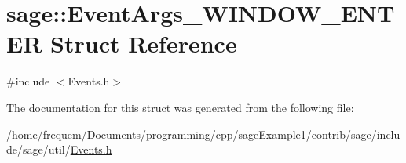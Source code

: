\hypertarget{structsage_1_1EventArgs__WINDOW__ENTER}{}\section{sage\+::Event\+Args\+\_\+\+W\+I\+N\+D\+O\+W\+\_\+\+E\+N\+T\+ER Struct Reference}
\label{structsage_1_1EventArgs__WINDOW__ENTER}


{\ttfamily \#include $<$Events.\+h$>$}



The documentation for this struct was generated from the following file\+:\begin{DoxyCompactItemize}
\item 
/home/frequem/\+Documents/programming/cpp/sage\+Example1/contrib/sage/include/sage/util/\mbox{\hyperlink{Events_8h}{Events.\+h}}\end{DoxyCompactItemize}
